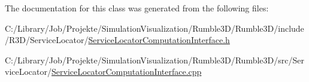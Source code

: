 The documentation for this class was generated from the following files\+:\begin{DoxyCompactItemize}
\item 
C\+:/\+Library/\+Job/\+Projekte/\+Simulation\+Visualization/\+Rumble3\+D/\+Rumble3\+D/include/\+R3\+D/\+Service\+Locator/\mbox{\hyperlink{_service_locator_computation_interface_8h}{Service\+Locator\+Computation\+Interface.\+h}}\item 
C\+:/\+Library/\+Job/\+Projekte/\+Simulation\+Visualization/\+Rumble3\+D/\+Rumble3\+D/src/\+Service\+Locator/\mbox{\hyperlink{_service_locator_computation_interface_8cpp}{Service\+Locator\+Computation\+Interface.\+cpp}}\end{DoxyCompactItemize}
